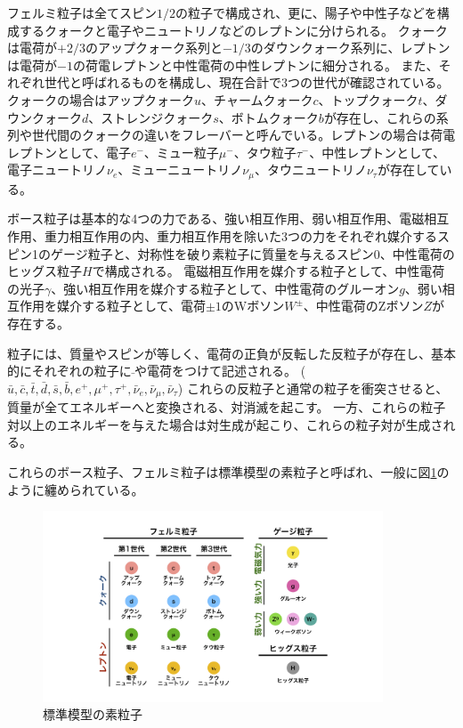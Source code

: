 フェルミ粒子は全てスピン$1/2$の粒子で構成され、更に、陽子や中性子などを構成するクォークと電子やニュートリノなどのレプトンに分けられる。
クォークは電荷が$+2/3$のアップクォーク系列と$-1/3$のダウンクォーク系列に、レプトンは電荷が$-1$の荷電レプトンと中性電荷の中性レプトンに細分される。
また、それぞれ世代と呼ばれるものを構成し、現在合計で3つの世代が確認されている。
クォークの場合はアップクォーク$u$、チャームクォーク$c$、トップクォーク$t$、ダウンクォーク$d$、ストレンジクォーク$s$、ボトムクォーク$b$が存在し、これらの系列や世代間のクォークの違いをフレーバーと呼んでいる。レプトンの場合は荷電レプトンとして、電子$e^-$、ミュー粒子$\mu^-$、タウ粒子$\tau^-$、中性レプトンとして、電子ニュートリノ$\nu_e$、ミューニュートリノ$\nu_{\mu}$、タウニュートリノ$\nu_{\tau}$が存在している。

ボース粒子は基本的な4つの力である、強い相互作用、弱い相互作用、電磁相互作用、重力相互作用の内、重力相互作用を除いた3つの力をそれぞれ媒介するスピン1のゲージ粒子と、対称性を破り素粒子に質量を与えるスピン0、中性電荷のヒッグス粒子$H$で構成される。
電磁相互作用を媒介する粒子として、中性電荷の光子$\gamma$、強い相互作用を媒介する粒子として、中性電荷のグルーオン$g$、弱い相互作用を媒介する粒子として、電荷$\pm 1$のWボソン$W^{\pm}$、中性電荷のZボソン$Z$が存在する。


粒子には、質量やスピンが等しく、電荷の正負が反転した反粒子が存在し、基本的にそれぞれの粒子に$\bar{}$や電荷をつけて記述される。 ($\bar{u}, \bar{c}, \bar{t}, \bar{d}, \bar{s}, \bar{b}, e^+, \mu^+, \tau^+, \bar{\nu}_{e}, \bar{\nu}_{\mu}, \bar{\nu}_{\tau}$)
これらの反粒子と通常の粒子を衝突させると、質量が全てエネルギーへと変換される、対消滅を起こす。
一方、これらの粒子対以上のエネルギーを与えた場合は対生成が起こり、これらの粒子対が生成される。

これらのボース粒子、フェルミ粒子は標準模型の素粒子と呼ばれ、一般に図\ref{1SMParticle}のように纏められている。

\begin{figure}[h]
 \centering
 \includegraphics[width=0.9\textwidth]{Figure/1Introduction/1SMParticle.png}
 \caption{標準模型の素粒子}
 \label{1SMParticle}
\end{figure}

